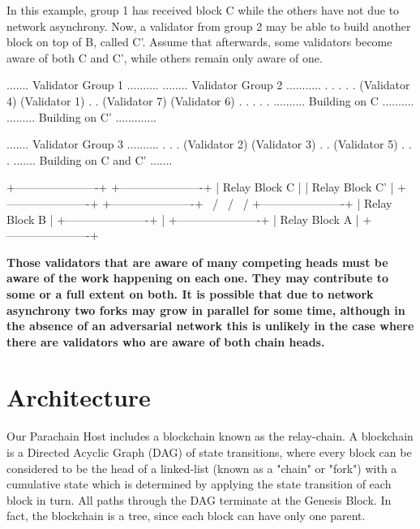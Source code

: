 In this example, group 1 has received block C while the others have not due to
network asynchrony. Now, a validator from group 2 may be able to build another
block on top of B, called C'. Assume that afterwards, some validators become
aware of both C and C', while others remain only aware of one.

\begin{verbnobox}[\small]
....... Validator Group 1 ..........      ........ Validator Group 2 ...........
.                                  .      .                                    .
.  (Validator 4) (Validator 1)     .      .    (Validator 7) (Validator 6)     .
.                                  .      .                                    .
.......... Building on C  ..........      ......... Building on C' .............


....... Validator Group 3 ..........
.                                  .
.   (Validator 2) (Validator 3)    .
.        (Validator 5)             .
.                                  .
....... Building on C and C' .......

        +----------------------+         +----------------------+
        |    Relay Block C     |         |    Relay Block C'    |
        +----------------------+         +----------------------+
                         \                 /
                          \               /
                           \             /
                    +----------------------+
                    |  Relay Block B       |
                    +----------------------+
                                |
                    +----------------------+
                    |  Relay Block A       |
                    +----------------------+
\end{verbnobox}

\textbf{Those validators that are aware of many competing heads must be aware of the
work happening on each one. They may contribute to some or a full extent on
both. It is possible that due to network asynchrony two forks may grow in
parallel for some time, although in the absence of an adversarial network this
is unlikely in the case where there are validators who are aware of both chain
heads.}

\section{Architecture}

Our Parachain Host includes a blockchain known as the relay-chain. A blockchain
is a Directed Acyclic Graph (DAG) of state transitions, where every block can be
considered to be the head of a linked-list (known as a "chain" or "fork") with a
cumulative state which is determined by applying the state transition of each
block in turn. All paths through the DAG terminate at the Genesis Block. In
fact, the blockchain is a tree, since each block can have only one parent.


